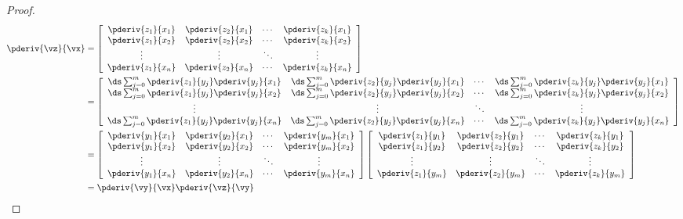 \begin{proof}
\begin{align*}
  \pderiv{\vz}{\vx}
    &= \left[\begin{array}{ccccc}
         \pderiv{z_1}{x_1} & \pderiv{z_2}{x_1} & \cdots & \pderiv{z_k}{x_1} \\
         \pderiv{z_1}{x_2} & \pderiv{z_2}{x_2} & \cdots & \pderiv{z_k}{x_2} \\
         \vdots            & \vdots            & \ddots & \vdots            \\
         \pderiv{z_1}{x_n} & \pderiv{z_2}{x_n} & \cdots & \pderiv{z_k}{x_n}
       \end{array}\right]
  \\&= \left[\begin{array}{ccccc}
         \ds\sum_{j=0}^m \pderiv{z_1}{y_j}\pderiv{y_j}{x_1}
       & \ds\sum_{j=0}^m \pderiv{z_2}{y_j}\pderiv{y_j}{x_1}
       & \cdots
       & \ds\sum_{j=0}^m \pderiv{z_k}{y_j}\pderiv{y_j}{x_1}
       \\
         \ds\sum_{j=0}^m \pderiv{z_1}{y_j}\pderiv{y_j}{x_2}
       & \ds\sum_{j=0}^m \pderiv{z_2}{y_j}\pderiv{y_j}{x_2}
       & \cdots
       & \ds\sum_{j=0}^m \pderiv{z_k}{y_j}\pderiv{y_j}{x_2}
       \\
         \vdots            & \vdots            & \ddots & \vdots
       \\
         \ds\sum_{j=0}^m \pderiv{z_1}{y_j}\pderiv{y_j}{x_n}
       & \ds\sum_{j=0}^m \pderiv{z_2}{y_j}\pderiv{y_j}{x_n}
       & \cdots
       & \ds\sum_{j=0}^m \pderiv{z_k}{y_j}\pderiv{y_j}{x_n}
       \end{array}\right]
  \\&= \left[\begin{array}{ccccc}
          \pderiv{y_1}{x_1} &  \pderiv{y_2}{x_1} & \cdots &  \pderiv{y_m}{x_1}  \\
          \pderiv{y_1}{x_2} &  \pderiv{y_2}{x_2} & \cdots &  \pderiv{y_m}{x_2}  \\
          \vdots            &  \vdots            & \ddots & \vdots              \\
          \pderiv{y_1}{x_n} &  \pderiv{y_2}{x_n} & \cdots &  \pderiv{y_m}{x_n}
       \end{array}\right]
       \left[\begin{array}{ccccc}
          \pderiv{z_1}{y_1} & \pderiv{z_2}{y_1}  & \cdots &  \pderiv{z_k}{y_1}  \\
          \pderiv{z_1}{y_2} & \pderiv{z_2}{y_2}  & \cdots &  \pderiv{z_k}{y_2}  \\
          \vdots            & \vdots             & \ddots & \vdots              \\
          \pderiv{z_1}{y_m} & \pderiv{z_2}{y_m}  & \cdots &  \pderiv{z_k}{y_m}
       \end{array}\right]
  \\&= \pderiv{\vy}{\vx} \pderiv{\vz}{\vy}
\end{align*}
\end{proof}


